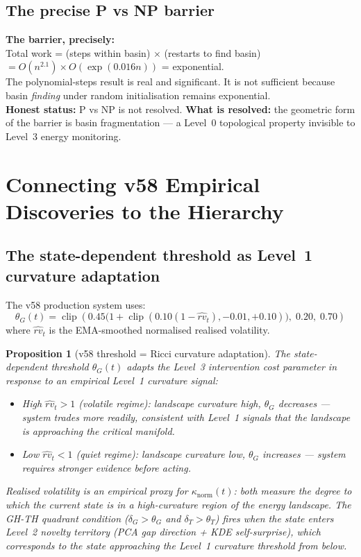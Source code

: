 \documentclass[11pt,a4paper]{article}
\newtheorem{proposition}[theorem]{Proposition}
\theoremstyle{definition}
\begin{document}
\subsection{The precise P vs NP barrier}

\begin{lockedbox}
\textbf{The barrier, precisely:} \\
Total work = (steps within basin) $\times$ (restarts to find basin)
$= O(n^{2.1}) \times O(\exp(0.016n))$ = exponential.\\[4pt]
The polynomial-steps result is real and significant.
It is not sufficient because basin \emph{finding} under random initialisation
remains exponential.\\[4pt]
\textbf{Honest status:} P vs NP is not resolved.
\textbf{What is resolved:} the geometric form of the barrier is basin fragmentation
--- a Level~0 topological property invisible to Level~3 energy monitoring.
\end{lockedbox}

\section{Connecting v58 Empirical Discoveries to the Hierarchy}
\label{sec:v58}

\subsection{The state-dependent threshold as Level~1 curvature adaptation}

The v58 production system uses:
\[
\theta_G(t) = \operatorname{clip}\!\left(0.45\bigl(1 + \operatorname{clip}(0.10(1-\hat{rv}_t),-0.01,+0.10)\bigr),\;0.20,\;0.70\right)
\]
where $\hat{rv}_t$ is the EMA-smoothed normalised realised volatility.

\begin{proposition}[v58 threshold = Ricci curvature adaptation]
The state-dependent threshold $\theta_G(t)$ adapts the Level~3 intervention cost
parameter in response to an empirical Level~1 curvature signal:
\begin{itemize}
\item High $\hat{rv}_t > 1$ (volatile regime): landscape curvature high,
  $\theta_G$ decreases --- system trades more readily, consistent with
  Level~1 signals that the landscape is approaching the critical manifold.
\item Low $\hat{rv}_t < 1$ (quiet regime): landscape curvature low,
  $\theta_G$ increases --- system requires stronger evidence before acting.
\end{itemize}
Realised volatility is an empirical proxy for $\kappa_\mathrm{norm}(t)$:
both measure the degree to which the current state is in a high-curvature
region of the energy landscape.
The GH-TH quadrant condition ($\delta_G > \theta_G$ and $\delta_T > \theta_T$)
fires when the state enters Level~2 novelty territory
(PCA gap direction + KDE self-surprise), which corresponds to the state
approaching the Level~1 curvature threshold from below.
\end{proposition}
\end{document}

